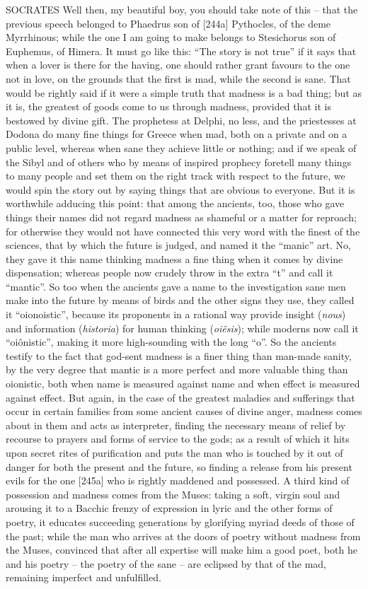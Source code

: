 SOCRATES Well then, my beautiful boy, you should take note of this --
that the previous speech belonged to Phaedrus son of {[}244a{]}
Pythocles, of the deme Myrrhinous; while the one I am going to make
belongs to Stesichorus son of Euphemus, of
Himera. It must go like
this: “The story is not true” if it says that when a lover is there for
the having, one should rather grant favours to the one not in love, on
the grounds that the first is mad,  while the second is sane.
That would be rightly said if it were a simple truth that madness is a
bad thing; but as it is, the greatest of goods come to us through
madness, provided that it is bestowed by divine gift. The prophetess at
Delphi, no less, and the priestesses at Dodona do many fine things for
Greece  when mad, both on a private and on a public level,
whereas when sane they achieve little or nothing; and if we speak of the
Sibyl and of others who by means of inspired prophecy foretell 
many things to many people and set them on the right track with respect
to the future, we would spin the story out by saying things that are
obvious to everyone. But it is worthwhile adducing this point: that
among the ancients, too, those who gave things their names did not
regard madness as shameful  or a matter for reproach; for
otherwise they would not have connected this very word with the finest
of the sciences, that by which the future is judged, and named it the
“manic” art. No, they gave it this name thinking madness a fine thing
when it comes by divine dispensation; whereas people now crudely
 throw in the extra “t” and call it
“mantic”. So too when the
ancients gave a name to the investigation sane men make into the future
by means of birds and the other signs they use, they called it
“oionoistic”, because its proponents in a rational way provide insight
({\em nous}) and information ({\em historia}) for human 
thinking ({\em oiêsis}); while moderns now call it “oiônistic”, making
it more high-sounding with the long “o”. So the ancients testify to the
fact that god-sent madness is a finer thing than man-made sanity, by the
very degree that mantic is a more perfect and more valuable thing than
oionistic, both when name is  measured against name and when
effect is measured against effect. But again, in the case of the
greatest maladies and sufferings that occur in certain families from
some ancient causes of divine anger, madness comes about in them and
acts as  interpreter, finding the necessary means of relief by
recourse to prayers and forms of service to the gods; as a result of
which it hits upon secret rites of purification and puts the man who is
touched by it out of
danger for both the present and the future, so finding a release from
his present evils for the one {[}245a{]} who is rightly maddened and
possessed. A third kind of possession and madness comes from the
Muses: taking a soft,
virgin soul and arousing it to a Bacchic frenzy of expression in lyric
and the other forms of poetry, it educates succeeding 
generations by glorifying myriad deeds of those of the past; while the
man who arrives at the doors of poetry without madness from the Muses,
convinced that after all expertise will make him a good poet, both he
and his poetry -- the poetry of the sane -- are eclipsed by that of the
mad, remaining imperfect and unfulfilled.

